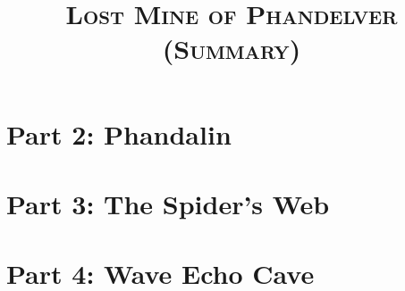 \documentclass{article}
\title{\textsc{\Huge Lost Mine of Phandelver (Summary)}}
\date{ }
\begin{document}
	\maketitle
	\begin{multicols*}{2}

	
	\pagebreak
	
	\pagebreak



	
	\section{Part 2: Phandalin}
	\section{Part 3: The Spider's Web}
	\section{Part 4: Wave Echo Cave}
	
	\end{multicols*}
	
\end{document}

